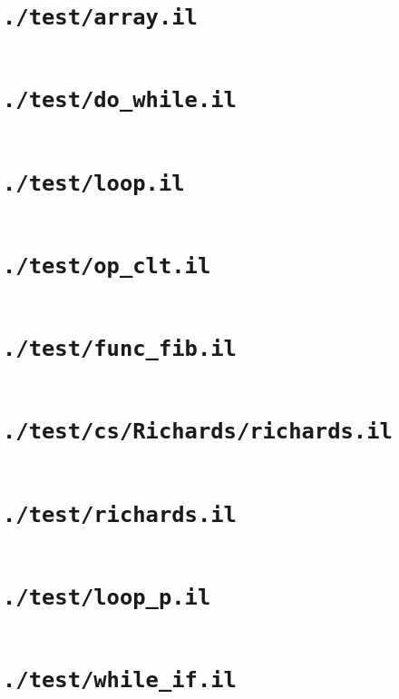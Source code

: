 \documentclass[a4paper, 11pt]{report}
\begin{document}
    \section{\lstinline{./test/array.il}}
    \inputminted{text}{./test/array.il}


    \section{\lstinline{./test/do_while.il}}
    \inputminted{text}{./test/do_while.il}


    \section{\lstinline{./test/loop.il}}
    \inputminted{text}{./test/loop.il}


    \section{\lstinline{./test/op_clt.il}}
    \inputminted{text}{./test/op_clt.il}


    \section{\lstinline{./test/func_fib.il}}
    \inputminted{text}{./test/func_fib.il}


    \section{\lstinline{./test/cs/Richards/richards.il}}
    \inputminted{text}{./test/cs/Richards/richards.il}


    \section{\lstinline{./test/richards.il}}
    \inputminted{text}{./test/richards.il}


    \section{\lstinline{./test/loop_p.il}}
    \inputminted{text}{./test/loop_p.il}


    \section{\lstinline{./test/while_if.il}}
    \inputminted{text}{./test/while_if.il}
\end{document}
